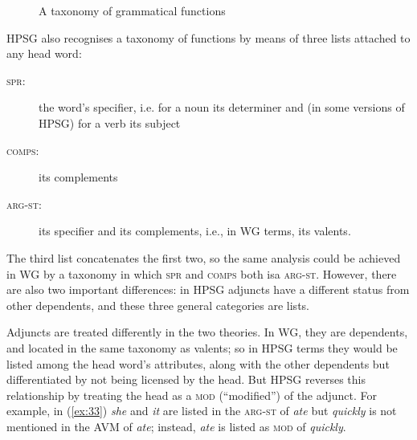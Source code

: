 \documentclass[output=paper]{langscibook}
\begin{document}
\begin{figure}
	\centering
{}
	\caption{A taxonomy of grammatical functions}
	\label{fig:17}
\end{figure}

HPSG also recognises a taxonomy of functions by means of three lists attached to any head word:

\begin{description}
	\item[\textnormal{\textsc{spr}:}] \label{it:spr} the word’s specifier, i.e. for a noun its determiner and (in some versions of HPSG) for a verb its subject
	
	\item[\textnormal{\textsc{comps}:}] \label{it:comps} its complements
	
	\item[\textnormal{\textsc{arg-st}:}] \label{it:arg-st} its specifier and its complements, i.e., in WG terms, its valents.
\end{description}

The third list concatenates the first two, so the same analysis could be achieved in WG by a taxonomy in which \textsc{spr} and \textsc{comps} both isa \textsc{arg-st}. However, there are also two important differences: in HPSG adjuncts have a different status from other dependents, and these three general categories are lists.

Adjuncts are treated differently in the two theories. In WG, they are dependents, and located in the same taxonomy as valents; so in HPSG terms they would be listed among the head word’s attributes, along with the other dependents but differentiated by not being licensed by the head. But HPSG reverses this relationship by treating the head as a \textsc{mod} (``modified'') of the adjunct. For example, in (\ref{ex:33}) \emph{she} and \emph{it} are listed in the \textsc{arg-st} of \emph{ate} but \emph{quickly} is not mentioned in the AVM of \emph{ate}; instead, \emph{ate} is listed as \textsc{mod} of \emph{quickly}.
\end{document}
